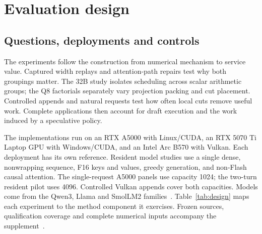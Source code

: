 \section{Evaluation design}
\label{sec:eval}

\subsection{Questions, deployments and controls}
The experiments follow the construction from numerical mechanism to service value. Captured width replays and attention-path repairs test why both groupings matter. The 32B study isolates scheduling across scalar arithmetic groups; the Q8 factorials separately vary projection packing and cut placement. Controlled appends and natural requests test how often local cuts remove useful work. Complete applications then account for draft execution and the work induced by a speculative policy.

The implementations run on an RTX A5000 with Linux/CUDA, an RTX 5070 Ti Laptop GPU with Windows/CUDA, and an Intel Arc B570 with Vulkan. Each deployment has its own reference. Resident model studies use a single dense, nonwrapping sequence, F16 keys and values, greedy generation, and non-Flash causal attention. The single-request A5000 panels use capacity 1024; the two-turn resident pilot uses 4096. Controlled Vulkan appends cover both capacities. Models come from the Qwen3, Llama and SmolLM2 families~\cite{qwen3,llama3,smol}. Table~\ref{tab:design} maps each experiment to the method component it exercises. Frozen sources, qualification coverage and complete numerical inputs accompany the supplement~\cite{records}.

